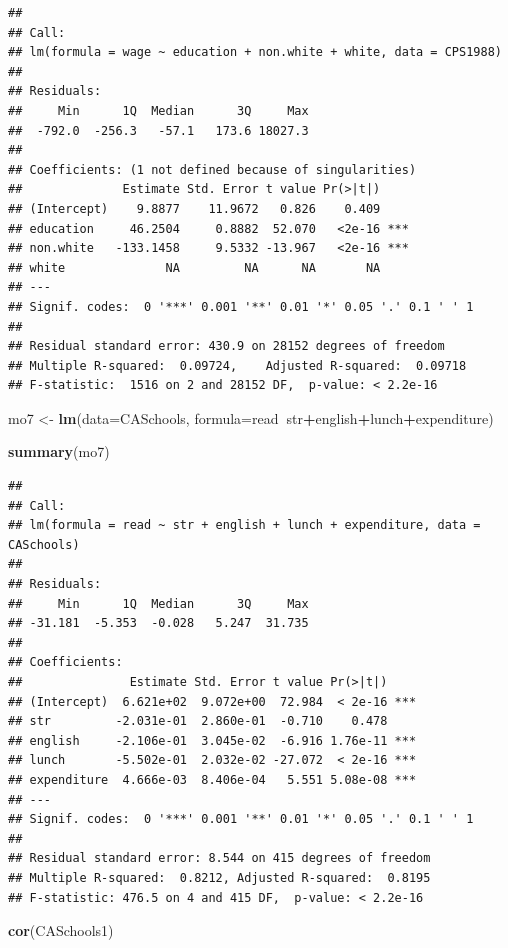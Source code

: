 \documentclass[
]{book}
\newenvironment{Shaded}{\begin{snugshade}}{\end{snugshade}}
\newcommand{\DataTypeTok}[1]{\textcolor[rgb]{0.13,0.29,0.53}{#1}}
\newcommand{\KeywordTok}[1]{\textcolor[rgb]{0.13,0.29,0.53}{\textbf{#1}}}
\newcommand{\NormalTok}[1]{#1}
\newcommand{\OperatorTok}[1]{\textcolor[rgb]{0.81,0.36,0.00}{\textbf{#1}}}
\newcommand{\StringTok}[1]{\textcolor[rgb]{0.31,0.60,0.02}{#1}}
\begin{document}
\begin{verbatim}
## 
## Call:
## lm(formula = wage ~ education + non.white + white, data = CPS1988)
## 
## Residuals:
##     Min      1Q  Median      3Q     Max 
##  -792.0  -256.3   -57.1   173.6 18027.3 
## 
## Coefficients: (1 not defined because of singularities)
##              Estimate Std. Error t value Pr(>|t|)    
## (Intercept)    9.8877    11.9672   0.826    0.409    
## education     46.2504     0.8882  52.070   <2e-16 ***
## non.white   -133.1458     9.5332 -13.967   <2e-16 ***
## white              NA         NA      NA       NA    
## ---
## Signif. codes:  0 '***' 0.001 '**' 0.01 '*' 0.05 '.' 0.1 ' ' 1
## 
## Residual standard error: 430.9 on 28152 degrees of freedom
## Multiple R-squared:  0.09724,    Adjusted R-squared:  0.09718 
## F-statistic:  1516 on 2 and 28152 DF,  p-value: < 2.2e-16
\end{verbatim}

\begin{Shaded}
\begin{Highlighting}[]
\NormalTok{mo7 <-}\StringTok{ }\KeywordTok{lm}\NormalTok{(}\DataTypeTok{data=}\NormalTok{CASchools, }\DataTypeTok{formula=}\NormalTok{read}\OperatorTok{~}\NormalTok{str}\OperatorTok{+}\NormalTok{english}\OperatorTok{+}\NormalTok{lunch}\OperatorTok{+}\NormalTok{expenditure)}

\KeywordTok{summary}\NormalTok{(mo7)}
\end{Highlighting}
\end{Shaded}

\begin{verbatim}
## 
## Call:
## lm(formula = read ~ str + english + lunch + expenditure, data = CASchools)
## 
## Residuals:
##     Min      1Q  Median      3Q     Max 
## -31.181  -5.353  -0.028   5.247  31.735 
## 
## Coefficients:
##               Estimate Std. Error t value Pr(>|t|)    
## (Intercept)  6.621e+02  9.072e+00  72.984  < 2e-16 ***
## str         -2.031e-01  2.860e-01  -0.710    0.478    
## english     -2.106e-01  3.045e-02  -6.916 1.76e-11 ***
## lunch       -5.502e-01  2.032e-02 -27.072  < 2e-16 ***
## expenditure  4.666e-03  8.406e-04   5.551 5.08e-08 ***
## ---
## Signif. codes:  0 '***' 0.001 '**' 0.01 '*' 0.05 '.' 0.1 ' ' 1
## 
## Residual standard error: 8.544 on 415 degrees of freedom
## Multiple R-squared:  0.8212, Adjusted R-squared:  0.8195 
## F-statistic: 476.5 on 4 and 415 DF,  p-value: < 2.2e-16
\end{verbatim}

\begin{Shaded}
\begin{Highlighting}[]
\KeywordTok{cor}\NormalTok{(CASchools1)}
\end{Highlighting}
\end{Shaded}
\end{document}
